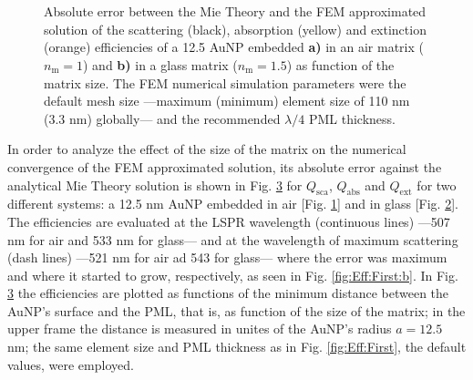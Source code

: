 %
\begin{figure}[b!]
	\centering
	\def\svgwidth{.9\textwidth}
	\small
	\vspace*{1.em}
	\hspace*{-.675\textwidth}
     \begin{subfigure}{\textwidth}\caption{}\label{fig:Eff:Matrix:a}\end{subfigure}\\[5.5em]
    \hspace*{-.675\textwidth}
     \begin{subfigure}{\textwidth}\caption{}\label{fig:Eff:Matrix:b}\end{subfigure}\\[-10.5em]
\caption[Scattering, Absorption and Extinction Efficiencies absolute error: Matrix size analysis ]{Absolute error between the Mie Theory and the FEM approximated solution of the scattering (black), absorption (yellow) and extinction (orange) efficiencies of a 12.5 AuNP embedded \textbf{a)} in an air matrix ($n_\text{m} = 1$) and \textbf{b)} in a glass matrix ($n_\text{m} = 1.5$) as function of the matrix size. The FEM numerical simulation parameters were the default mesh size ---maximum (minimum) element size of 110 nm (3.3 nm) globally--- and the recommended $\lambda/4$ PML thickness. }
\label{fig:Eff:Matrix}
\end{figure}
%
In order to analyze the effect of the size of the matrix on the numerical convergence of the FEM approximated solution, its absolute error against the analytical Mie Theory solution is shown in Fig. \ref{fig:Eff:Matrix} for $Q_\text{sca}$, $Q_\text{abs}$ and $Q_\text{ext}$ for two different systems: a 12.5 nm AuNP embedded in air [Fig. \ref{fig:Eff:Matrix:a}] and in glass [Fig. \ref{fig:Eff:Matrix:b}]. The efficiencies are evaluated at the LSPR wavelength (continuous lines) ---507 nm for air and 533 nm for glass--- and at the wavelength of maximum scattering (dash lines) ---521 nm for air ad 543 for glass--- where the error was maximum and where it started to grow, respectively, as seen in Fig. \ref{fig:Eff:First:b}. In Fig. \ref{fig:Eff:Matrix} the efficiencies are plotted as functions of the minimum distance between the AuNP's surface and the PML, that is, as function of the size of the matrix; in the upper frame the distance is measured in unites of the AuNP's radius $a=12.5$ nm; the same element size and PML thickness as in Fig. \ref{fig:Eff:First}, the default values, were employed.


